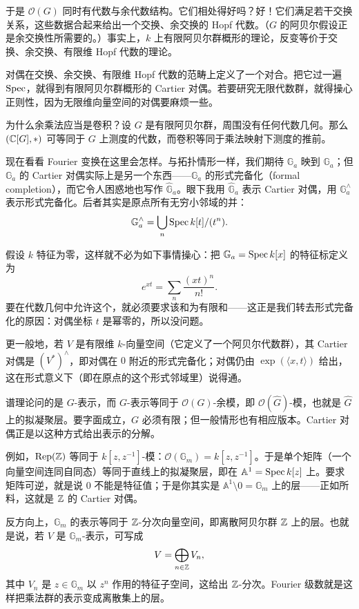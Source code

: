 于是 $\mathcal{O}(G)$ 同时有代数与余代数结构。它们相处得好吗？好！它们满足若干交换关系，这些数据合起来给出一个交换、余交换的 Hopf 代数。（$G$ 的阿贝尔假设正是余交换性所需要的。）事实上，$k$ 上有限阿贝尔群概形的理论，反变等价于交换、余交换、有限维 Hopf 代数的理论。

对偶在交换、余交换、有限维 Hopf 代数的范畴上定义了一个对合。把它过一遍 $\operatorname{Spec}$，就得到有限阿贝尔群概形的 Cartier 对偶。若要研究无限代数群，就得操心正则性，因为无限维向量空间的对偶要麻烦一些。

\begin{remark}
  为什么余乘法应当是卷积？设 $G$ 是有限阿贝尔群，周围没有任何代数几何。那么 $(\mathbb{C}[G], *)$ 可等同于 $G$ 上测度的代数，而卷积等同于乘法映射下测度的推前。
\end{remark}

现在看看 Fourier 变换在这里会怎样。与拓扑情形一样，我们期待 $\mathbb{G}_a$ 映到 $\mathbb{G}_a$；但 $\mathbb{G}_a$ 的 Cartier 对偶实际上是另一个东西——$\mathbb{G}_a$ 的形式完备化（formal completion），而它令人困惑地也写作 $\widehat{\mathbb{G}}_a$。眼下我用 $\widehat{\mathbb{G}}_a$ 表示 Cartier 对偶，用 $\mathbb{G}_a^\wedge$ 表示形式完备化。后者其实是原点所有无穷小邻域的并：
\[
  \mathbb{G}_a^\wedge = \bigcup_n \operatorname{Spec} k[t]/(t^n).
\]

假设 $k$ 特征为零，这样就不必为如下事情操心：把 $\mathbb{G}_a = \operatorname{Spec} k[x]$ 的特征标定义为
\[
  e^{xt} = \sum_n \frac{(xt)^n}{n!}.
\]
要在代数几何中允许这个，就必须要求该和为有限和——这正是我们转去形式完备化的原因：对偶坐标 $t$ 是幂零的，所以没问题。

更一般地，若 $V$ 是有限维 $k$-向量空间（它定义了一个阿贝尔代数群），其 Cartier 对偶是 $(V^*)^\wedge$，即对偶在 $0$ 附近的形式完备化；对偶仍由 $\exp(\langle x,t\rangle)$ 给出，这在形式意义下（即在原点的这个形式邻域里）说得通。

谱理论问的是 $G$-表示，而 $G$-表示等同于 $\mathcal{O}(G)$-余模，即 $\mathcal{O}(\widehat{G})$-模，也就是 $\widehat{G}$ 上的拟凝聚层。要字面成立，$G$ 必须有限；但一般情形也有相应版本。Cartier 对偶正是以这种方式给出表示的分解。

例如，$\operatorname{Rep}(\mathbb{Z})$ 等同于 $k[z,z^{-1}]$-模：$\mathcal{O}(\mathbb{G}_m) = k[z,z^{-1}]$。于是单个矩阵（一个向量空间连同自同态）等同于直线上的拟凝聚层，即在 $\mathbb{A}^1 = \operatorname{Spec} k[z]$ 上。要求矩阵可逆，就是说 $0$ 不能是特征值；于是你其实是 $\mathbb{A}^1\setminus 0 = \mathbb{G}_m$ 上的层——正如所料，这就是 $\mathbb{Z}$ 的 Cartier 对偶。

反方向上，$\mathbb{G}_m$ 的表示等同于 $\mathbb{Z}$-分次向量空间，即离散阿贝尔群 $\mathbb{Z}$ 上的层。也就是说，若 $V$ 是 $\mathbb{G}_m$-表示，可写成
\[
  V = \bigoplus_{n\in\mathbb{Z}} V_n,
\]
其中 $V_n$ 是 $z\in\mathbb{G}_m$ 以 $z^n$ 作用的特征子空间，这给出 $\mathbb{Z}$-分次。Fourier 级数就是这样把乘法群的表示变成离散集上的层。

